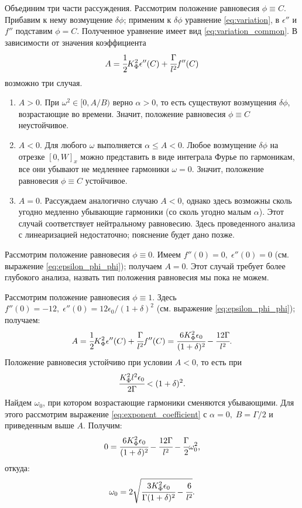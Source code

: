 Объединим три части рассуждения. Рассмотрим положение равновесия $\phi \equiv C$. Прибавим к нему возмущение $\delta \phi$; применим к $\delta \phi$ уравнение \eqref{eq:variation}, в $\epsilon''$ и $f''$ подставим $\phi = C$. Полученное уравнение имеет вид \eqref{eq:variation_common}. В зависимости от значения коэффициента
$$A = \cfrac{1}{2} K_\Phi^2 \epsilon''(C) + \cfrac{\Gamma}{l^2} f''(C)$$
возможно три случая.
\begin{enumerate}[label=\arabic*.]
	\item $A > 0$. При $\omega^2 \in [0, A / B)$ верно $\alpha > 0$, то есть существуют возмущения $\delta \phi$, возрастающие во времени. Значит, положение равновесия $\phi \equiv C$ неустойчивое.
	\item $A < 0$. Для любого $\omega$ выполняется $\alpha \leqslant A < 0$. Любое возмущение $\delta \phi$ на отрезке $[0, W]_x$ можно представить в виде интеграла Фурье по гармоникам, все они убывают не медленнее гармоники $\omega = 0$. Значит, положение равновесия $\phi \equiv C$ устойчивое.
	\item $A = 0$. Рассуждаем аналогично случаю $A < 0$, однако здесь возможны сколь угодно медленно убывающие гармоники (со сколь угодно малым $\alpha$). Этот случай соответствует нейтральному равновесию. Здесь проведенного анализа с линеаризацией недостаточно; пояснение будет дано позже.
\end{enumerate}

Рассмотрим положение равновесия $\phi \equiv 0$. Имеем $f''(0) = 0, \; \epsilon''(0) = 0$ (см. выражение \eqref{eq:epsilon_phi_phi}); получаем $A = 0$. Этот случай требует более глубокого анализа, назвать тип положения равновесия мы пока не можем.

Рассмотрим положение равновесия $\phi \equiv 1$. Здесь $f''(0) = -12, \; \epsilon''(0) = 12 \epsilon_0 / (1 + \delta)^2$ (см. выражение \eqref{eq:epsilon_phi_phi}); получаем:
$$A = \cfrac{1}{2} K_\Phi^2 \epsilon''(C) + \cfrac{\Gamma}{l^2} f''(C) = \cfrac{6 K_\Phi^2 \epsilon_0}{(1 + \delta)^2} - \cfrac{12 \Gamma}{l^2} {\text{.}}$$
Положение равновесия устойчиво при условии $A < 0$, то есть при
\begin{equation}
	\cfrac{K_\Phi^2 l^2 \epsilon_0}{2 \Gamma} < (1 + \delta)^2 {\text{.}}
	\label{cond:equilibrium_1_stable}
\end{equation}
Найдем $\omega_0$, при котором возрастающие гармоники сменяются убывающими. Для этого рассмотрим выражение \eqref{eq:exponent_coefficient} с $\alpha = 0, \; B = \Gamma / 2$ и приведенным выше $A$. Получим:
$$0 = \cfrac{6 K_\Phi^2 \epsilon_0}{(1 + \delta)^2} - \cfrac{12 \Gamma}{l^2} - \cfrac{\Gamma}{2} \omega_0^2 {\text{,}}$$
откуда:
$$\omega_0 = 2 \sqrt{\cfrac{3 K_\Phi^2 \epsilon_0}{\Gamma (1 + \delta)^2} - \cfrac{6}{l^2}} {\text{.}}$$


